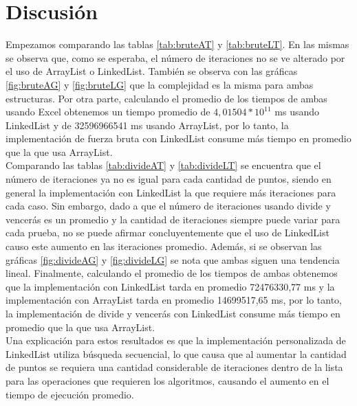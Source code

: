 \section{Discusión}
Empezamos comparando las tablas \ref{tab:bruteAT} y \ref{tab:bruteLT}. En las mismas se observa que, como se esperaba, el número de iteraciones no se  ve alterado por el uso de ArrayList o LinkedList. También se observa con las gráficas \ref{fig:bruteAG} y \ref{fig:bruteLG} que la complejidad es la misma para ambas estructuras. Por otra parte, calculando el promedio de los tiempos de ambas usando Excel obtenemos un tiempo promedio de $4,01504*10^{11}$ ms usando LinkedList y de 32596966541 ms usando ArrayList, por lo tanto, la implementación de fuerza bruta con LinkedList consume más tiempo en promedio que la que usa ArrayList.\\

Comparando las tablas \ref{tab:divideAT} y \ref{tab:divideLT} se encuentra que el número de iteraciones ya no es igual para cada cantidad de puntos, siendo en general la implementación con LinkedList la que requiere más iteraciones para cada caso. Sin embargo, dado a que el número de iteraciones usando divide y vencerás es un promedio y la cantidad de iteraciones siempre puede variar para cada prueba, no se puede afirmar concluyentemente que el uso de LinkedList causo este aumento en las iteraciones promedio. Además, si se observan las gráficas \ref{fig:divideAG} y \ref{fig:divideLG} se nota que ambas siguen una tendencia lineal. Finalmente, calculando el promedio de los tiempos de ambas obtenemos que la implementación con LinkedList tarda en promedio 72476330,77 ms y la implementación con ArrayList tarda en promedio 14699517,65 ms, por lo tanto, la implementación de divide y vencerás con LinkedList consume más tiempo en promedio que la que usa ArrayList.\\

Una explicación para estos resultados es que la implementación personalizada de LinkedList utiliza búsqueda secuencial, lo que causa que al aumentar la cantidad de puntos se requiera una cantidad considerable de iteraciones dentro de la lista para las operaciones que requieren los algoritmos, causando el aumento en el tiempo de ejecución promedio.